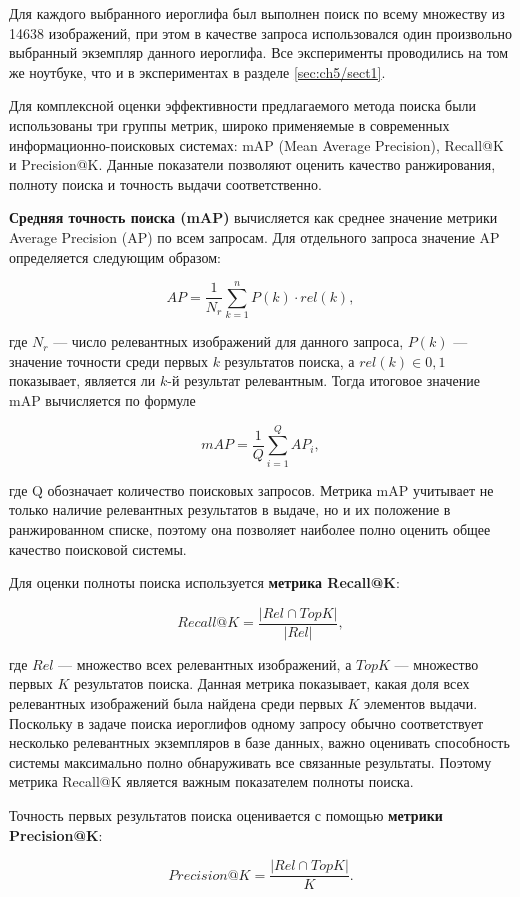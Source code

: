 Для каждого выбранного иероглифа был выполнен поиск по всему множеству из 14638 изображений, при этом в качестве запроса использовался один произвольно выбранный экземпляр данного иероглифа. Все эксперименты проводились на том же ноутбуке, что и в экспериментах в разделе \cref{sec:ch5/sect1}.

Для комплексной оценки эффективности предлагаемого метода поиска были использованы три группы метрик, широко применяемые в современных информационно-поисковых системах: mAP (Mean Average Precision), Recall@K и Precision@K. Данные показатели позволяют оценить качество ранжирования, полноту поиска и точность выдачи соответственно.

\textbf{Средняя точность поиска (mAP)} вычисляется как среднее значение метрики Average Precision (AP) по всем запросам. Для отдельного запроса значение AP определяется следующим образом:

\[
    AP=\frac{1}{N_r}\sum_{k=1}^{n} P(k)\cdot rel(k),
\]

где $N_r$ — число релевантных изображений для данного запроса, $P(k)$ — значение точности среди первых $k$ результатов поиска, а $rel(k)\in{0,1}$ показывает, является ли $k$-й результат релевантным. Тогда итоговое значение mAP вычисляется по формуле

\[
    mAP=\frac{1}{Q}\sum_{i=1}^{Q} AP_i,
\]

где Q обозначает количество поисковых запросов. Метрика mAP учитывает не только наличие релевантных результатов в выдаче, но и их положение в ранжированном списке, поэтому она позволяет наиболее полно оценить общее качество поисковой системы.

Для оценки полноты поиска используется \textbf{метрика Recall@K}:

\[
    Recall@K=\frac{|Rel\cap TopK|}{|Rel|},
\]

где $Rel$ — множество всех релевантных изображений, а $TopK$ — множество первых $K$ результатов поиска. Данная метрика показывает, какая доля всех релевантных изображений была найдена среди первых $K$ элементов выдачи. Поскольку в задаче поиска иероглифов одному запросу обычно соответствует несколько релевантных экземпляров в базе данных, важно оценивать способность системы максимально полно обнаруживать все связанные результаты. Поэтому метрика Recall@K является важным показателем полноты поиска.

Точность первых результатов поиска оценивается с помощью \textbf{метрики Precision@K}:

\[
    Precision@K=\frac{|Rel\cap TopK|}{K}.
\]

